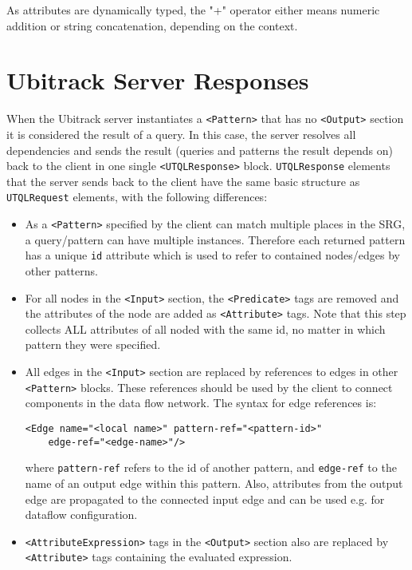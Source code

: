 \documentclass[11pt]{article}
\begin{document}
As attributes are dynamically typed, the
"+" operator either means numeric addition or string concatenation, depending
on the context.

\section{Ubitrack Server Responses}
\label{response}

When the Ubitrack server instantiates a 
\texttt{<Pattern>} that has no \texttt{<Output>} section it is considered the result of a query. In this case, the
server resolves all dependencies and sends the result (queries and
patterns the result depends on) back to the client in one single 
\texttt{<UTQLResponse>} block. \texttt{UTQLResponse} elements that the server sends back to the client have the same basic structure as \texttt{UTQLRequest} elements, with the following differences:

\begin{itemize}
 \item As a \texttt{<Pattern>}
    specified by the client can match multiple places in the SRG, a
    query/pattern can have multiple instances. Therefore each returned
    pattern has a unique \texttt{id}
    attribute which is used to refer to contained nodes/edges by
    other patterns.
 \item For all nodes in the \texttt{<Input>}
    section, the \texttt{<Predicate>}
    tags are removed and the attributes of the node are added as \texttt{<Attribute>}
    tags. Note that this step collects ALL attributes of all noded with the same id, no matter in which pattern they were specified.  \item All edges in the \texttt{<Input>} section are replaced by references to edges in other 
    \texttt{<Pattern>}
    blocks. These references should be used by the client to connect
    components in the data flow network. The syntax for edge references is:
\begin{Verbatim}[fontsize=\footnotesize,tabsize=2]
<Edge name="<local name>" pattern-ref="<pattern-id>" 
	edge-ref="<edge-name>"/>
\end{Verbatim}
   where \texttt{pattern-ref} refers to the id of another pattern, and \texttt{edge-ref} to the name of an output edge within this pattern. Also, attributes from the output edge are propagated to the connected input edge and can be used e.g. for dataflow configuration.

 \item \texttt{<AttributeExpression>} tags in the \texttt{<Output>}
 section also are replaced by \texttt{<Attribute>}
 tags containing the evaluated expression.
\end{itemize}
\end{document}
